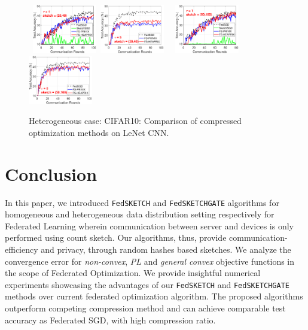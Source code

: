 \documentclass[sigconf, anonymous, review]{acmart}
\begin{document}
\begin{figure}[h]
	\begin{center}
		\mbox{%
\includegraphics[width=0.25\textwidth]{CIFAR_figures/cifar_local1_sketch20_iid0_test_acc.eps} 
		\includegraphics[width=0.25\textwidth]{CIFAR_figures/cifar_local5_sketch20_iid0_test_acc.eps}
		}
		\mbox{%
		\includegraphics[width=0.25\textwidth]{CIFAR_figures/cifar_local1_sketch50_iid0_test_acc.eps}
		\includegraphics[width=0.25\textwidth]{CIFAR_figures/cifar_local5_sketch50_iid0_test_acc.eps}
		}
	\end{center}
	\caption{Heterogeneous case: CIFAR10: Comparison of compressed optimization methods on LeNet CNN.}
    \label{fig:CIFAR-heter}
\end{figure}




\section{Conclusion}


In this paper, we introduced \texttt{FedSKETCH} and \texttt{FedSKETCHGATE} algorithms for homogeneous and heterogeneous data distribution setting respectively for Federated Learning wherein communication between server and devices is only performed using count sketch. 
Our algorithms, thus, provide communication-efficiency and privacy, through random hashes based sketches. 
We analyze the convergence error for \emph{non-convex}, \emph{PL} and \emph{general convex} objective functions in the scope of Federated Optimization.  
We provide insightful numerical experiments showcasing the advantages of our \texttt{FedSKETCH} and \texttt{FedSKETCHGATE} methods over current federated optimization algorithm. The proposed algorithms outperform competing compression method and can achieve comparable test accuracy as Federated SGD, with high compression ratio.
\end{document}

